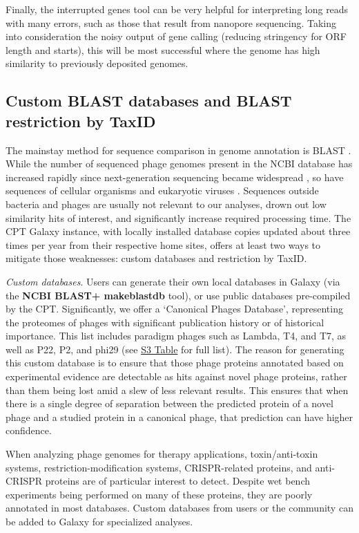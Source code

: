 Finally, the interrupted genes tool can be very helpful for interpreting
long reads with many errors, such as those that result from nanopore
sequencing. Taking into consideration the noisy output of gene calling
(reducing stringency for ORF length and starts), this will be most
successful where the genome has high similarity to previously deposited
genomes.

\subsection*{Custom BLAST databases and BLAST restriction by TaxID}

The mainstay method for sequence comparison in genome annotation is
BLAST \cite{Camacho_2009}. While the number of sequenced phage genomes present in
the NCBI database has increased rapidly since next-generation sequencing
became widespread \cite{Hatfull_2011,Merrill_2016}, so have sequences of cellular organisms
and eukaryotic viruses \cite{O_Leary_2015}. Sequences outside bacteria and phages
are usually not relevant to our analyses, drown out low similarity hits
of interest, and significantly increase required processing time. The
CPT Galaxy instance, with locally installed database copies updated
about three times per year from their respective home sites, offers at
least two ways to mitigate those weaknesses: custom databases and
restriction by TaxID.

\emph{Custom databases}. Users can generate their own local databases in
Galaxy (via the \textbf{NCBI BLAST+ makeblastdb} tool), or use public
databases pre-compiled by the CPT. Significantly, we offer a `Canonical
Phages Database', representing the proteomes of phages with significant
publication history or of historical importance. This list includes
paradigm phages such as Lambda, T4, and T7, as well as P22, P2, and
phi29 (see \protect\hyperlink{pcbi.1008214.s003}{S3 Table} for full
list). The reason for generating this custom database is to ensure that
those phage proteins annotated based on experimental evidence are
detectable as hits against novel phage proteins, rather than them being
lost amid a slew of less relevant results. This ensures that when there
is a single degree of separation between the predicted protein of a
novel phage and a studied protein in a canonical phage, that prediction
can have higher confidence.

When analyzing phage genomes for therapy applications, toxin/anti-toxin
systems, restriction-modification systems, CRISPR-related proteins, and
anti-CRISPR proteins are of particular interest to detect. Despite wet
bench experiments being performed on many of these proteins, they are
poorly annotated in most databases. Custom databases from users or the
community can be added to Galaxy for specialized analyses.

